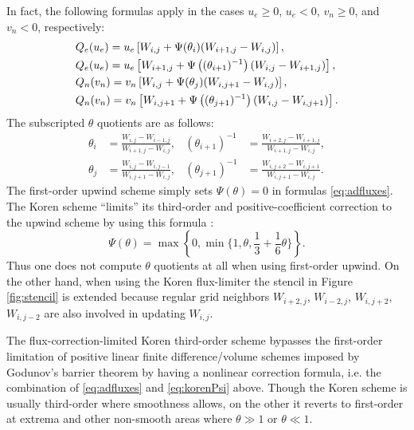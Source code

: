 \documentclass[gmd]{copernicus}   %
\begin{document}
In fact, the following formulas apply in the cases $u_e \ge 0$, $u_e < 0$, $v_n \ge 0$, and $v_n < 0$, respectively:
\begin{align}
&Q_e(u_e) = u_e \left[W_{i,j} + \Psi(\theta_{i}) (W_{i+1,j} - W_{i,j})\right], \label{eq:adfluxes} \\ 
&Q_e(u_e) = u_e \left[W_{i+1,j} + \Psi\left((\theta_{i+1})^{-1}\right) (W_{i,j} - W_{i+1,j})\right],  \notag \\
&Q_n(v_n) = v_n \left[W_{i,j} + \Psi(\theta_{j}) (W_{i,j+1} - W_{i,j})\right], \notag \\
&Q_n(v_n) = v_n \left[W_{i,j+1} + \Psi\left((\theta_{j+1})^{-1}\right) (W_{i,j} - W_{i,j+1})\right].\notag
\end{align}
The subscripted $\theta$ quotients are as follows:
\begin{align*}
\theta_i &= \frac{W_{i,j}-W_{i-1,j}}{W_{i+1,j} - W_{i,j}}, & (\theta_{i+1})^{-1} &= \frac{W_{i+2,j}-W_{i+1,j}}{W_{i+1,j} - W_{i,j}}, \\
\theta_j &= \frac{W_{i,j}-W_{i,j-1}}{W_{i,j+1} - W_{i,j}}, & (\theta_{j+1})^{-1} &= \frac{W_{i,j+2}-W_{i,j+1}}{W_{i,j+1} - W_{i,j}}.
\end{align*}
The first-order upwind scheme simply sets $\Psi(\theta)=0$ in formulas \eqref{eq:adfluxes}.  The Koren scheme ``limits'' its third-order and positive-coefficient correction to the upwind scheme by using this formula \citep{HundsdorferVerwer2010}:
\begin{equation}
\Psi(\theta) = \max\left\{0,\min\Big\{1,\theta,\frac{1}{3}+\frac{1}{6} \theta\Big\}\right\}.  \label{eq:korenPsi}
\end{equation}
Thus one does not compute $\theta$ quotients at all when using first-order upwind.  On the other hand, when using the Koren flux-limiter the stencil in Figure \ref{fig:stencil} is extended because regular grid neighbors $W_{i+2,j}$, $W_{i-2,j}$, $W_{i,j+2}$, $W_{i,j-2}$ are also involved in updating $W_{i,j}$.

The flux-correction-limited Koren third-order scheme bypasses the first-order limitation of positive linear finite difference/volume schemes imposed by Godunov's barrier theorem \citep[section I.7.1]{HundsdorferVerwer2010} by having a nonlinear correction formula, i.e. the combination of \eqref{eq:adfluxes} and \eqref{eq:korenPsi} above.  Though the Koren scheme is usually third-order where smoothness allows, on the other it reverts to first-order at extrema and other non-smooth areas where $\theta \gg 1$ or $\theta \ll 1$.
\end{document}
